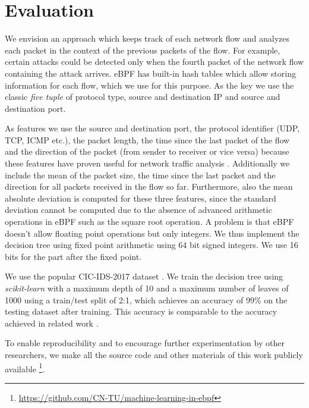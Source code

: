 \documentclass[conference]{IEEEtran}
\begin{document}
\section{Evaluation}

We envision an approach which keeps track of each network flow and analyzes each packet in the context of the previous packets of the flow. For example, certain attacks could be detected only when the fourth packet of the network flow containing the attack arrives. eBPF has built-in hash tables which allow storing information for each flow, which we use for this purpose. As the key we use the classic \textit{five tuple} of protocol type, source and destination IP and source and destination port. 


As features we use the source and destination port, the protocol identifier (UDP, TCP, ICMP etc.), the packet length, the time since the last packet of the flow and the direction of the packet (from sender to receiver or vice versa) because these features have proven useful for network traffic analysis \cite{iglesias_ntarc_2020}. Additionally we include the mean of the packet size, the time since the last packet and the direction for all packets received in the flow so far. Furthermore, also the mean absolute deviation is computed for these three features, since the standard deviation cannot be computed due to the absence of advanced arithmetic operations in eBPF such as the square root operation.  A problem is that eBPF doesn't allow floating point operations but only integers. We thus implement the decision tree using fixed point arithmetic using 64 bit signed integers. We use 16 bits for the part after the fixed point.

We use the popular CIC-IDS-2017 dataset \cite{sharafaldin_toward_2018}. We train the decision tree using \textit{scikit-learn} with a maximum depth of 10 and a maximum number of leaves of 1000 using a train/test split of 2:1, which achieves an accuracy of 99\% on the testing dataset after training. This accuracy is comparable to the accuracy achieved in related work \cite{hartl_explainability_2020}. 

To enable reproducibility and to encourage further experimentation by other researchers, we make all the source code and other materials of this work publicly available \footnote{\url{https://github.com/CN-TU/machine-learning-in-ebpf}}.
\end{document}
